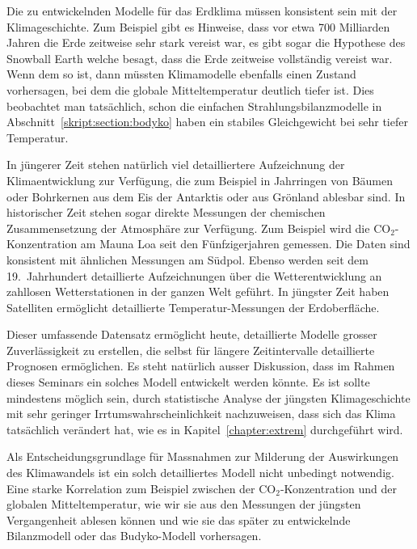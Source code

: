 Die zu entwickelnden Modelle für das Erdklima müssen konsistent sein
mit der Klimageschichte.
Zum Beispiel gibt es Hinweise, dass vor etwa 700 Milliarden Jahren die
Erde zeitweise sehr stark vereist war, es gibt sogar die Hypothese des
Snowball Earth welche besagt, dass die Erde zeitweise vollständig
vereist war.
Wenn dem so ist, dann müssten Klimamodelle ebenfalls einen Zustand
vorhersagen, bei dem die globale Mitteltemperatur deutlich tiefer ist.
Dies beobachtet man tatsächlich, schon die einfachen
Strahlungsbilanzmodelle in Abschnitt~\ref{skript:section:bodyko}
haben ein stabiles Gleichgewicht bei sehr tiefer Temperatur.

In jüngerer Zeit stehen natürlich viel detailliertere Aufzeichnung der
Klimaentwicklung zur Verfügung, die zum Beispiel in Jahrringen von Bäumen
oder Bohrkernen aus dem Eis der Antarktis oder aus Grönland ablesbar sind.
In historischer Zeit stehen sogar direkte Messungen der chemischen
Zusammensetzung der Atmosphäre zur Verfügung.
Zum Beispiel wird die $\text{CO}_2$-Konzentration am Mauna Loa seit den 
Fünfzigerjahren gemessen.
Die Daten sind konsistent mit ähnlichen Messungen am Südpol.
Ebenso werden seit dem 19.~Jahrhundert detaillierte Aufzeichnungen
über die Wetterentwicklung an zahllosen Wetterstationen in der ganzen
Welt geführt.
In jüngster Zeit haben Satelliten ermöglicht detaillierte
Temperatur-Messungen der Erdoberfläche.

Dieser umfassende Datensatz ermöglicht heute, detaillierte Modelle
grosser Zuverlässigkeit zu erstellen, die selbst für längere Zeitintervalle
detaillierte Prognosen ermöglichen.
Es steht natürlich ausser Diskussion, dass im Rahmen dieses Seminars
ein solches Modell entwickelt werden könnte.
Es ist sollte mindestens möglich sein, durch statistische Analyse der
jüngsten Klimageschichte mit sehr geringer Irrtumswahrscheinlichkeit
nachzuweisen, dass sich das Klima tatsächlich verändert hat, wie es
in Kapitel~\ref{chapter:extrem} durchgeführt wird.

Als Entscheidungsgrundlage für Massnahmen zur Milderung der Auswirkungen
des Klimawandels ist ein solch detailliertes Modell nicht unbedingt notwendig.
Eine starke Korrelation zum Beispiel zwischen der $\text{CO}_2$-Konzentration
und der globalen Mitteltemperatur, wie wir sie aus den Messungen der
jüngsten Vergangenheit ablesen können und wie sie das später zu entwickelnde
Bilanzmodell oder das Budyko-Modell vorhersagen.







